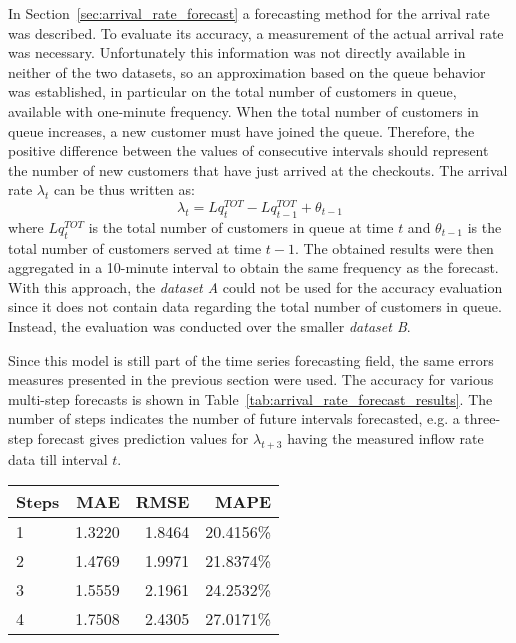 In Section~\ref{sec:arrival_rate_forecast} a forecasting method for the arrival rate was described. To evaluate its accuracy, a measurement of the actual arrival rate was necessary. Unfortunately this information was not directly available in neither of the two datasets, so an approximation based on the queue behavior was established, in particular on the total number of customers in queue, available with one-minute frequency. When the total number of customers in queue increases, a new customer must have joined the queue. Therefore, the positive difference between the values of consecutive intervals should represent the number of new customers that have just arrived at the checkouts. The arrival rate \( \lambda_t \) can be thus written as:
\begin{equation}
  \lambda_t = Lq_t^{TOT} - Lq_{t-1}^{TOT} + \theta_{t-1}
\end{equation}
where \( Lq_t^{TOT} \) is the total number of customers in queue at time \( t \) and \( \theta_{t-1} \) is the total number of customers served at time \( t-1 \). The obtained results were then aggregated in a 10-minute interval to obtain the same frequency as the forecast. With this approach, the \emph{dataset A} could not be used for the accuracy evaluation since it does not contain data regarding the total number of customers in queue. Instead, the evaluation was conducted over the smaller \emph{dataset B}.

Since this model is still part of the time series forecasting field, the same errors measures presented in the previous section were used. The accuracy for various multi-step forecasts is shown in Table~\ref{tab:arrival_rate_forecast_results}. The number of steps indicates the number of future intervals forecasted, e.g. a three-step forecast gives prediction values for \( \lambda_{t+3} \) having the measured inflow rate data till interval \( t \).

\begin{center}
  \begin{tabular}{ l r r r }
    \hline
    Steps & MAE    & RMSE   & MAPE      \\
    \hline
    1     & 1.3220 & 1.8464 & 20.4156\% \\
    2     & 1.4769 & 1.9971 & 21.8374\% \\
    3     & 1.5559 & 2.1961 & 24.2532\% \\
    4     & 1.7508 & 2.4305 & 27.0171\% \\
    \hline
  \end{tabular}
\end{center}

